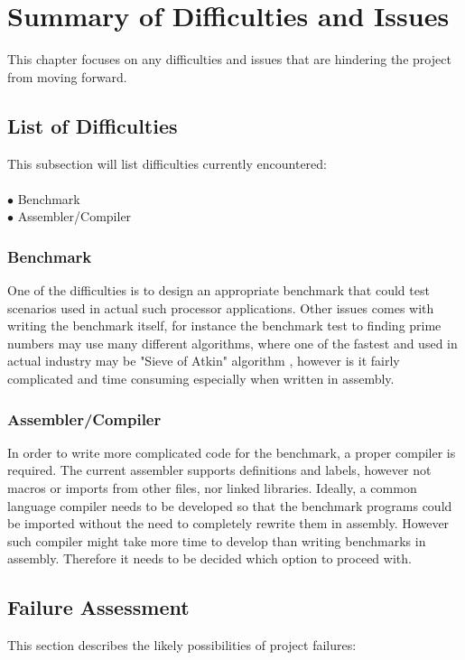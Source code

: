 \documentclass[a4paper,12pt]{article}
\begin{document}
\section{Summary of Difficulties and Issues}
\begin{multicols}{2}
This chapter focuses on any difficulties and issues that are hindering the project from moving forward.

\subsection{List of Difficulties}

This subsection will list difficulties currently encountered:\\
\\
$\bullet$ Benchmark\\
$\bullet$ Assembler/Compiler

\subsubsection{Benchmark} \label{sec:benchmark_issues}
One of the difficulties is to design an appropriate benchmark that could test scenarios used in actual such processor applications. Other issues comes with writing the benchmark itself, for instance the benchmark test to finding prime numbers may use many different algorithms, where one of the fastest and used in actual industry may be "Sieve of Atkin" algorithm \autocite{morain_1989}, however is it fairly complicated and time consuming especially when written in assembly. 

\subsubsection{Assembler/Compiler}
In order to write more complicated code for the benchmark, a proper compiler is required. The current assembler supports definitions and labels, however not macros or imports from other files, nor linked libraries. Ideally, a common language compiler needs to be developed so that the benchmark programs could be imported without the need to completely rewrite them in assembly. However such compiler might take more time to develop than writing benchmarks in assembly. Therefore it needs to be decided which option to proceed with.

\subsection{Failure Assessment}
This section describes the likely possibilities of project failures:


\end{multicols}
\end{document}
